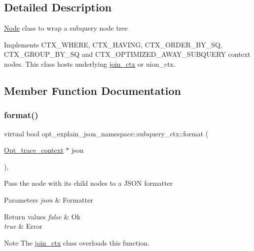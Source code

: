\subsection{Detailed Description}
\mbox{\hyperlink{classNode}{Node}} class to wrap a subquery node tree

Implements C\+T\+X\+\_\+\+W\+H\+E\+RE, C\+T\+X\+\_\+\+H\+A\+V\+I\+NG, C\+T\+X\+\_\+\+O\+R\+D\+E\+R\+\_\+\+B\+Y\+\_\+\+SQ, C\+T\+X\+\_\+\+G\+R\+O\+U\+P\+\_\+\+B\+Y\+\_\+\+SQ and C\+T\+X\+\_\+\+O\+P\+T\+I\+M\+I\+Z\+E\+D\+\_\+\+A\+W\+A\+Y\+\_\+\+S\+U\+B\+Q\+U\+E\+RY context nodes. This class hosts underlying \mbox{\hyperlink{classopt__explain__json__namespace_1_1join__ctx}{join\+\_\+ctx}} or uion\+\_\+ctx. 

\subsection{Member Function Documentation}
\mbox{\label{classopt__explain__json__namespace_1_1subquery__ctx_ab09c364c9a8a64f548140c8035309dc6}} 
\subsubsection{\texorpdfstring{format()}{format()}}
{\footnotesize\ttfamily virtual bool opt\+\_\+explain\+\_\+json\+\_\+namespace\+::subquery\+\_\+ctx\+::format (\begin{DoxyParamCaption}\item[{\mbox{\hyperlink{classOpt__trace__context}{Opt\+\_\+trace\+\_\+context}} $\ast$}]{json }\end{DoxyParamCaption})\hspace{0.3cm}{\ttfamily [inline]}, {\ttfamily [virtual]}}

Pass the node with its child nodes to a J\+S\+ON formatter


\begin{DoxyParams}{Parameters}
{\em json} & Formatter\\
\hline
\end{DoxyParams}

\begin{DoxyRetVals}{Return values}
{\em false} & Ok \\
\hline
{\em true} & Error\\
\hline
\end{DoxyRetVals}
\begin{DoxyNote}{Note}
The {\ttfamily \mbox{\hyperlink{classopt__explain__json__namespace_1_1join__ctx}{join\+\_\+ctx}}} class overloads this function. 
\end{DoxyNote}


